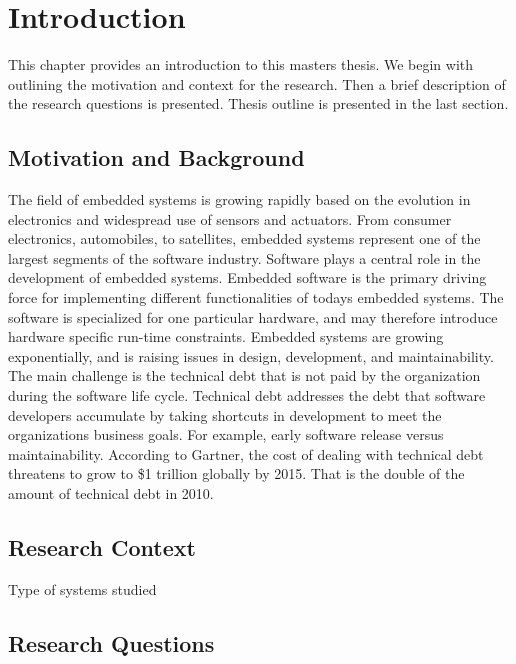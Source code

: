 
\chapter{Introduction}

This chapter provides an introduction to this masters thesis. We begin with outlining the motivation and context for the research. Then a brief description of the research questions is presented. Thesis outline is presented in the last section.


\section{Motivation and Background}
The field of embedded systems is growing rapidly based on the evolution in electronics and widespread use of sensors and actuators. From consumer electronics, automobiles, to satellites, embedded systems represent one of the largest segments of the software industry. Software plays a central role in the development of embedded systems. Embedded software is the primary driving force for implementing different functionalities of todays embedded systems. The software is specialized for one particular hardware, and may therefore introduce hardware specific run-time constraints. Embedded systems are growing exponentially\cite{graaf2003embedded}, and is raising issues in design, development, and maintainability. The main challenge is the technical debt that is not paid by the organization during the software life cycle. Technical debt addresses the debt that software developers accumulate by taking shortcuts in development to meet the organizations business goals. For example, early software release versus maintainability. According to Gartner\cite{gartner2010}, the cost of dealing with technical debt threatens to grow to \$1 trillion globally by 2015. That is the double of the amount of technical debt in 2010. 



\section{Research Context}
Type of systems studied


\section{Research Questions}


